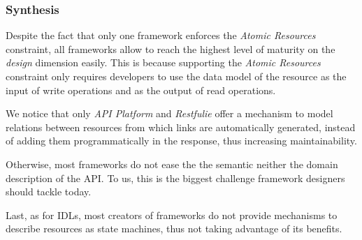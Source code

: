 \subsubsection*{Synthesis}
Despite the fact that only one framework enforces the \textit{Atomic Resources} constraint, all frameworks allow to reach the highest level of maturity on the \textit{design} dimension easily. This is because supporting the \textit{Atomic Resources} constraint only requires developers to use the data model of the resource as the input of write operations and as the output of read operations.

We notice that only \textit{API Platform} and \textit{Restfulie} offer a mechanism to model relations between resources from which links are automatically generated, instead of adding them programmatically in the response, thus increasing maintainability.

Otherwise, most frameworks do not ease the the semantic neither the domain description of the API. To us, this is the biggest challenge framework designers should tackle today.

Last, as for IDLs, most creators of frameworks do not provide mechanisms to describe resources as state machines, thus not taking advantage of its benefits.

